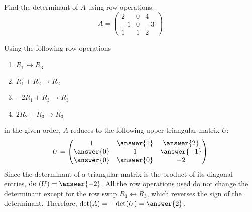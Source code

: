 \documentclass{ximera}
\author{Parisa Fatheddin}
\begin{document}
\begin{exercise}


  Find the determinant of $A$ using row operations.
  \[
    A = \begin{pmatrix}
      2 & 0 & 4\\
      -1 & 0 & -3\\
      1 & 1 & 2
    \end{pmatrix}
  \]

  \begin{prompt}
    Using the following row operations
    \begin{enumerate}
    \item $R_1 \leftrightarrow R_3$
    \item $R_1 + R_2 \to R_2$
    \item $-2R_1 + R_3 \to R_3$
    \item  $2R_2 + R_3 \to R_3$
    \end{enumerate}
    in the given order, $A$ reduces to the following upper triangular
    matrix $U$:
    \[
      U =
      \begin{pmatrix}
        1 & \answer{1} & \answer{2}\\
        \answer{0} & 1 & \answer{-1}\\
        \answer{0} & \answer{0} & -2
      \end{pmatrix}
    \]
    Since the determinant of a triangular matrix is the product of its
    diagonal entries, $\det(U) = \answer{-2}$. All the row operations
    used do not change the determinant except for the row swap
    $R_1 \leftrightarrow R_3$, which reverses the sign of the
    determinant. Therefore, $\det(A) = -\det(U) = \answer{2}$.
  \end{prompt}


\end{exercise}
\end{document}
